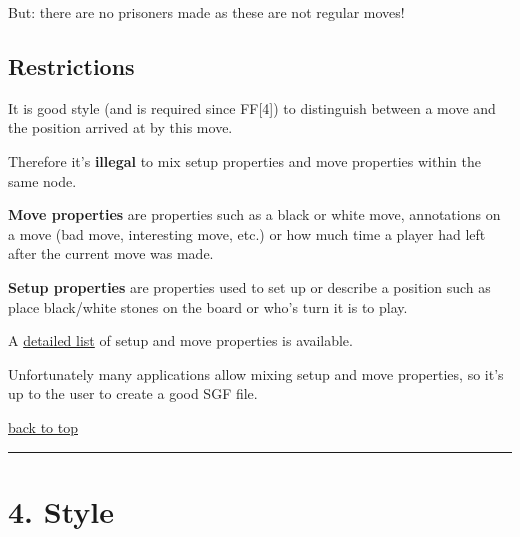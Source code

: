 But: there are no prisoners made as these are not regular moves!

\subsection{Restrictions}\label{restrictions-3}

It is good style (and is required since FF{[}4{]}) to distinguish
between a move and the position arrived at by this move.

Therefore it's \textbf{illegal} to mix setup properties and move
properties within the same node.

\textbf{Move properties} are properties such as a black or white move,
annotations on a move (bad move, interesting move, etc.) or how much
time a player had left after the current move was made.

\textbf{Setup properties} are properties used to set up or describe a
position such as place black/white stones on the board or who's turn it
is to play.

A \href{https://red-bean.com/sgf/proplist_t.html}{detailed list} of
setup and move properties is available.

Unfortunately many applications allow mixing setup and move properties,
so it's up to the user to create a good SGF file.

\href{https://red-bean.com/sgf/user_guide/index.html\#toc}{back to top}

\begin{center}\rule{0.5\linewidth}{0.5pt}\end{center}

\section{4. Style}\label{style}

